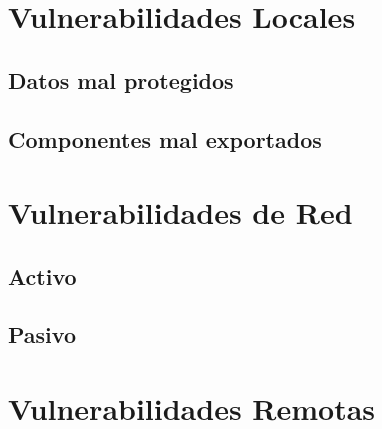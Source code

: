 \documentclass[11pt, a4paper, twoside]{article}
\begin{document}
\clearpage{\pagestyle{empty}}

\clearpage{%
  \pagestyle{empty}\tableofcontents%
  \vspace{3cm}%
  \cleardoublepage%
}
\setcounter{page}{1}

\section{Vulnerabilidades Locales}
\subsection{Datos mal protegidos}
\subsection{Componentes mal exportados}

\clearpage
{}
\section{Vulnerabilidades de Red}
\subsection{Activo}
\subsection{Pasivo}

\clearpage
{}
\section{Vulnerabilidades Remotas}
\end{document}
